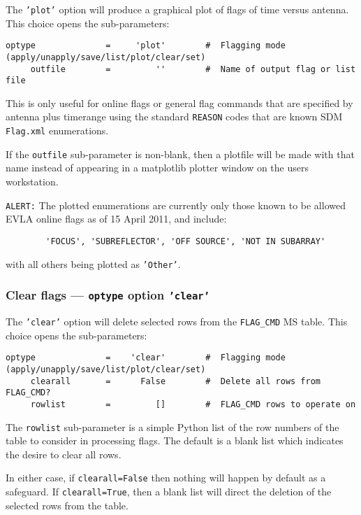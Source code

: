 The {\tt 'plot'} option will produce a graphical plot of flags of time versus antenna.
This choice opens the sub-parameters:
\small
\begin{verbatim}
optype              =     'plot'        #  Flagging mode (apply/unapply/save/list/plot/clear/set)
     outfile        =         ''        #  Name of output flag or list file
\end{verbatim}
\normalsize
This is only useful for online flags or general flag commands that are
specified by antenna plus timerange using the standard {\tt REASON}
codes that are known SDM {\tt Flag.xml} enumerations.

If the {\tt outfile} sub-parameter is non-blank, then a plotfile will
be made with that name instead of appearing in a matplotlib plotter window
on the users workstation.

{\tt ALERT:} The plotted enumerations are currently only those known
to be allowed EVLA online flags as of 15 April 2011, and include:
\begin{verbatim}
        'FOCUS', 'SUBREFLECTOR', 'OFF SOURCE', 'NOT IN SUBARRAY'
\end{verbatim}
with all others being plotted as {\tt 'Other'}.

\subsubsection{Clear flags --- {\tt optype} option {\tt 'clear'}}
\label{section:edit.flagcmd.optype.clear}

The {\tt 'clear'} option will delete selected rows from the 
{\tt FLAG\_CMD} MS table.
This choice opens the sub-parameters:
\small
\begin{verbatim}
optype              =    'clear'        #  Flagging mode (apply/unapply/save/list/plot/clear/set)
     clearall       =      False        #  Delete all rows from FLAG_CMD?
     rowlist        =         []        #  FLAG_CMD rows to operate on
\end{verbatim}
\normalsize

The {\tt rowlist} sub-parameter is a simple Python list of the row
numbers of the table to consider in processing flags.  The default is
a blank list which indicates the desire to clear all rows.

In either case, if {\tt clearall=False} then nothing will
happen by default as a safeguard.  If {\tt clearall=True}, then a 
blank list will direct the deletion of the selected rows from the table.

